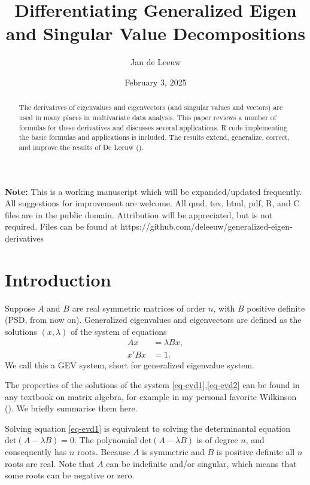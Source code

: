 \documentclass[
  12pt,
  letterpaper,
  DIV=11,
  numbers=noendperiod]{scrartcl}
\title{Differentiating Generalized Eigen and Singular Value
Decompositions}
\author{Jan de Leeuw}
\date{February 3, 2025}
\newcommand{\sectionbreak}{\clearpage}
\renewcommand*\contentsname{Table of contents}
\newcommand\contentsname{Table of contents}
\begin{document}
\maketitle
\begin{abstract}
The derivatives of eigenvalues and eigenvectors (and singular values and
vectors) are used in many places in multivariate data analysis. This
paper reviews a number of formulas for these derivatives and discusses
several applications. R code implementing the basic formulas and
applications is included. The results extend, generalize, correct, and
improve the results of De Leeuw ().
\end{abstract}

\renewcommand*\contentsname{Table of contents}
{
\hypersetup{linkcolor=}
\setcounter{tocdepth}{3}
\tableofcontents
}

\sectionbreak

\textbf{Note:} This is a working manuscript which will be
expanded/updated frequently. All suggestions for improvement are
welcome. All qmd, tex, html, pdf, R, and C files are in the public
domain. Attribution will be appreciated, but is not required. Files can
be found at https://github.com/deleeuw/generalized-eigen-derivatives

\sectionbreak

\section{Introduction}\label{sec-intro}

Suppose \(A\) and \(B\) are real symmetric matrices of order \(n\), with
\(B\) positive definite (PSD, from now on). Generalized eigenvalues and
eigenvectors are defined as the solutions \((x,\lambda)\) of the system
of equations \begin{subequations}
\begin{align}
Ax&=\lambda Bx,\label{eq-evd1}\\
x'Bx&=1.\label{eq-evd2}
\end{align}
\end{subequations} We call this a GEV system, short for generalized
eigenvalue system.

The properties of the solutions of the system
\eqref{eq-evd1},\eqref{eq-evd2} can be found in any textbook on matrix
algebra, for example in my personal favorite Wilkinson
(). We briefly summarise them here.

Solving equation \eqref{eq-evd1} is equivalent to solving the
determinantal equation \(\text{det}(A-\lambda B)=0\). The polynomial
\(\text{det}(A-\lambda B)\) is of degree \(n\), and consequently has
\(n\) roots. Because \(A\) is symmetric and \(B\) is positive definite
all \(n\) roots are real. Note that \(A\) can be indefinite and/or
singular, which means that some roots can be negative or zero.
\end{document}
